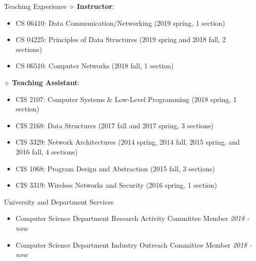 \documentclass{resume} %
\begin{document}
\begin{rSection}{Teaching Experience}
$\diamond$ {\bf Instructor}: 
\begin{itemize}
	\item CS 06410: Data Communication/Networking (2019 spring, 1 section)
	\item CS 04225: Principles of Data Structures (2019 spring and 2018 fall, 2 sections)
	\item CS 06510: Computer Networks (2018 fall, 1 section)
\end{itemize}
$\diamond$ {\bf Teaching Assistant}: 

\begin{itemize}
	\item  CIS 2107: Computer Systems \& Low-Level Programming (2018 spring, 1 section)
	\item CIS 2168: Data Structures (2017 fall and 2017 spring, 3 sections)
	\item  CIS 3329: Network Architectures (2014 spring, 2014 fall, 2015 spring, and 2016 fall, 4 sections)
	\item  CIS 1068: Program Design and Abstraction (2015 fall, 3 sections)
	\item  CIS 3319: Wireless Networks and Security (2016 spring, 1 section)
\end{itemize}
\end{rSection}

\begin{rSection}{University and Department Services}
\begin{itemize}
	\item Computer Science Department Research Activity Committee Member \hfill \textit{2018 - now}
	\item Computer Science Department Industry Outreach Committee Member \hfill \textit{2018 - now}
\end{itemize}
\end{rSection}
\end{document}
